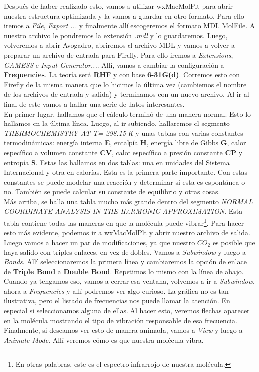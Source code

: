 \documentclass[10pt,letterpaper]{article}
\begin{document}
Despu\'es de haber realizado esto, vamos a utilizar wxMacMolPlt para abrir nuestra estructura optimizada y la vamos a guardar en otro formato. Para ello iremos a \textit{File}, \textit{Export ...} y finalmente all\'i escogeremos el formato MDL MolFile. A nuestro archivo le pondremos la extensi\'on \textit{.mdl} y lo guardaremos. Luego, volveremos a abrir Avogadro, abriremos el archivo MDL y vamos a volver a preparar un archivo de entrada para Firefly. Para ello iremos a \textit{Extensions}, \textit{GAMESS} e \textit{Input Generator...}. All\'i, vamos a cambiar la configuraci\'on a \textbf{Frequencies}. La teor\'ia ser\'a \textbf{RHF} y con base \textbf{6-31G(d)}. Corremos esto con Firefly de la misma manera que lo hicimos la \'ultima vez (cambiemos el nombre de los archivos de entrada y salida) y terminamos con un nuevo archivo. Al ir al final de este vamos a hallar una serie de datos interesantes.\\

En primer lugar, hallamos que el c\'alculo termin\'o de una manera normal. Esto lo hallamos en la \'ultima l\'inea. Luego, al ir subiendo, hallaremos el segmento \textit{THERMOCHEMISTRY AT T=  298.15 K} y unas tablas con varias constantes termodin\'amicas: energ\'ia interna \textbf{E}, entalp\'ia \textbf{H}, energ\'ia libre de Gibbs \textbf{G}, calor espec\'ifico a volumen constante \textbf{CV}, calor espec\'ifico a presi\'on constante \textbf{CP} y entrop\'ia \textbf{S}. Estas las hallamos en dos tablas: una en unidades del Sistema Internacional y otra en calor\'ias. Esta es la primera parte importante. Con estas constantes se puede modelar una reacci\'on y determinar si esta es espont\'anea o no. Tambi\'en se puede calcular su constante de equilibrio y otras cosas.\\

M\'as arriba, se halla una tabla mucho m\'as grande dentro del segmento \textit{NORMAL COORDINATE ANALYSIS IN THE HARMONIC APPROXIMATION}. Esta tabla contiene todas las maneras en que la mol\'ecula puede vibrar\footnote{En otras palabras, este es el espectro infrarrojo de nuestra mol\'ecula.}. Para hacer esto m\'as evidente, podemos ir a wxMacMolPlt y abrir nuestro archivo de salida. Luego vamos a hacer un par de modificaciones, ya que nuestro $CO_2$ es posible que haya salido con triples enlaces, en vez de dobles. Vamos a \textit{Subwindow} y luego a \textit{Bonds}. All\'i seleccionaremos la primera l\'inea y cambiaremos la opci\'on de enlace de \textbf{Triple Bond} a \textbf{Double Bond}. Repetimos lo mismo con la l\'inea de abajo. Cuando ya tengamos eso, vamos a cerrar esa ventana, volvemos a ir a \textit{Subwindow}, ahora a \textit{Frequencies} y all\'i podremos ver algo curioso. La gr\'afica no es tan ilustrativa, pero el listado de frecuencias nos puede llamar la atenci\'on. En especial si seleccionamos alguna de ellas. Al hacer esto, veremos flechas aparecer en la mol\'ecula mostrando el tipo de vibraci\'on responsable de esa frecuencia. Finalmente, si deseamos ver esto de manera animada, vamos a \textit{View} y luego a \textit{Animate Mode}. All\'i veremos c\'omo es que nuestra mol\'ecula vibra.\\
\end{document}
